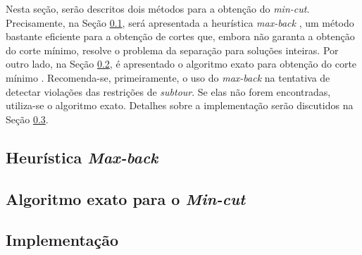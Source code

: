 

Nesta seção, serão descritos dois métodos para a obtenção do \textit{min-cut}. Precisamente, na Seção \ref{sec:maxBack}, será apresentada a heurística \textit{max-back} \cite{denisnaddef}, um método bastante eficiente para a obtenção de cortes que, embora não garanta a obtenção do corte mínimo, resolve o problema da separação para soluções inteiras. Por outro lado, na Seção \ref{sec:minCut}, é apresentado o algoritmo exato para obtenção do corte mínimo \cite{Stoer:1997:SMA:263867.263872}. Recomenda-se, primeiramente, o uso do \textit{max-back} na tentativa de detectar violações das restrições de \textit{subtour}. Se elas não forem encontradas, utiliza-se o algoritmo exato. Detalhes sobre a implementação serão discutidos na Seção \ref{sec:implementacao}.    

\subsection{Heurística \textit{Max-back}} \label{sec:maxBack}

\subsection{Algoritmo exato para o \textit{Min-cut}} \label{sec:minCut}

\subsection{Implementação} \label{sec:implementacao}



